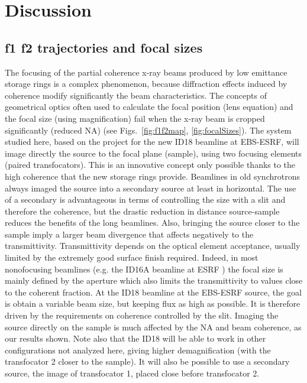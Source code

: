 \documentclass{iucr}              %
\begin{document}
\newpage


\section{Discussion}
\label{sec:discussion}


\subsection{f1 f2 trajectories and focal sizes} 

The focusing of the partial coherence x-ray beams produced by low emittance storage rings is a complex phenomenon, because diffraction effects induced by coherence modify significantly the  beam characteristics. The concepts of geometrical optics often used to calculate the focal position (lens equation) and the focal size (using magnification) fail when the x-ray beam is cropped significantly (reduced NA) (see Figs.~\ref{fig:f1f2map}, \ref{fig:focalSizes}).
The system studied here, based on the project for the new ID18 beamline at EBS-ESRF, will image directly the source to the focal plane (sample), using two focusing elements (paired transfocators). This is an innovative concept only possible thanks to the high coherence that the new storage rings provide. Beamlines in old synchrotrons always imaged the source into a secondary source at least in horizontal. The use of a secondary is advantageous in terms of controlling the size with a slit and therefore the coherence, but the drastic reduction in distance source-sample reduces the benefits of the long beamlines. Also, bringing the source closer to the sample imply a larger beam divergence that affects negatively to the transmittivity. Transmittivity depends on the optical element acceptance, usually limited by the extremely good surface finish required. Indeed, in most nonofocusing beamlines (e.g. the ID16A beamline at ESRF \cite{ID16A} \cite{hierarchical}) the focal size is mainly defined by  the aperture which also limits the transmittivity to values close to the coherent fraction. At the ID18 beamline at the EBS-ESRF source, the goal is obtain a variable beam size, but keeping flux as high as possible. It is therefore driven by the requirements on coherence controlled by the slit. Imaging the source directly on the sample is much affected by the NA and beam coherence, as our results shown. Note also that the ID18 will be able to work in other configurations not analyzed here, giving higher demagnification (with the transfocator 2 closer to the sample). It will also be possible to use a secondary source, the image of transfocator 1, placed close before transfocator 2.
\end{document}
